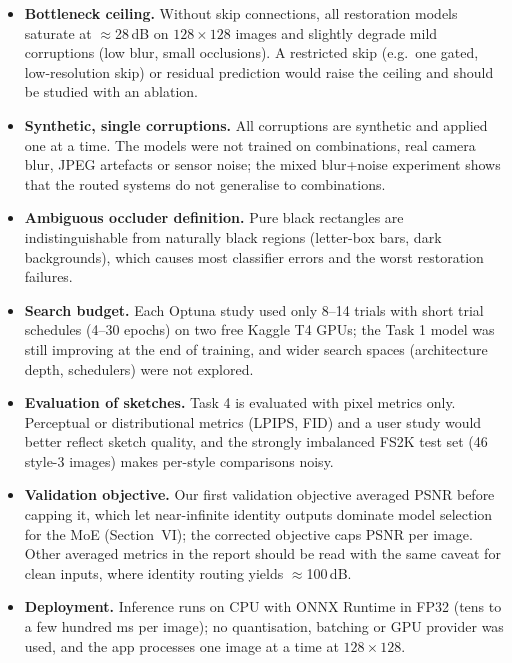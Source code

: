 \begin{itemize}
\item \textbf{Bottleneck ceiling.} Without skip connections, all restoration models saturate at $\approx$28\,dB on $128\times128$ images and slightly degrade mild corruptions (low blur, small occlusions). A restricted skip (e.g.\ one gated, low-resolution skip) or residual prediction would raise the ceiling and should be studied with an ablation.
\item \textbf{Synthetic, single corruptions.} All corruptions are synthetic and applied one at a time. The models were not trained on combinations, real camera blur, JPEG artefacts or sensor noise; the mixed blur+noise experiment shows that the routed systems do not generalise to combinations.
\item \textbf{Ambiguous occluder definition.} Pure black rectangles are indistinguishable from naturally black regions (letter-box bars, dark backgrounds), which causes most classifier errors and the worst restoration failures.
\item \textbf{Search budget.} Each Optuna study used only 8--14 trials with short trial schedules (4--30 epochs) on two free Kaggle T4 GPUs; the Task 1 model was still improving at the end of training, and wider search spaces (architecture depth, schedulers) were not explored.
\item \textbf{Evaluation of sketches.} Task 4 is evaluated with pixel metrics only. Perceptual or distributional metrics (LPIPS, FID) and a user study would better reflect sketch quality, and the strongly imbalanced FS2K test set (46 style-3 images) makes per-style comparisons noisy.
\item \textbf{Validation objective.} Our first validation objective averaged PSNR before capping it, which let near-infinite identity outputs dominate model selection for the MoE (Section~VI); the corrected objective caps PSNR per image. Other averaged metrics in the report should be read with the same caveat for clean inputs, where identity routing yields $\approx$100\,dB.
\item \textbf{Deployment.} Inference runs on CPU with ONNX Runtime in FP32 (tens to a few hundred ms per image); no quantisation, batching or GPU provider was used, and the app processes one image at a time at $128\times128$.
\end{itemize}
